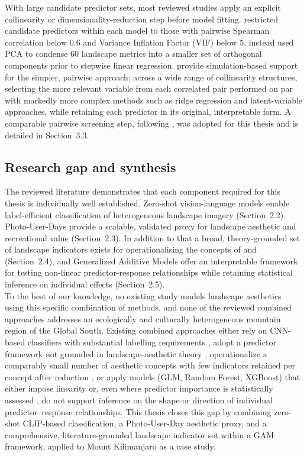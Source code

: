 \documentclass[hidelinks, 11pt]{article}
\begin{document}
With large candidate predictor sets, most reviewed studies apply an explicit collinearity or dimensionality-reduction step before model fitting. \citet{vaz_digital_2020} restricted candidate predictors within each model to those with pairwise Spearman correlation below 0.6 and Variance Inflation 
Factor (VIF) below 5. \citet{schirpke_predicting_2013} instead used PCA to condense 60 landscape metrics into a smaller set of orthogonal components prior to stepwise linear regression. \citet{dormann_collinearity_2013} provide simulation-based support for the simpler, pairwise approach: across a wide range of collinearity structures, selecting the more relevant variable from each correlated pair performed on par with markedly more complex methods such as ridge regression and latent-variable approaches, while retaining each predictor in its original, interpretable form. A comparable pairwise 
screening step, following \citet{vaz_digital_2020}, was adopted for this thesis and is detailed in Section~3.3.

\subsection{Research gap and synthesis}
The reviewed literature demonstrates that each component required for this thesis is individually well established. Zero-shot vision-language models 
enable label-efficient classification of heterogeneous landscape imagery (Section~2.2). Photo-User-Days provide a scalable, validated proxy for landscape aesthetic and recreational value (Section~2.3). In addition to that a broad, theory-grounded set of landscape indicators exists for operationalising the concepts of \citet{ode_capturing_2008} and 
\citet{tveit_key_2006} (Section~2.4), and Generalized Additive Models offer an interpretable framework for testing non-linear predictor-response relationships while retaining statistical inference on individual effects (Section~2.5).
\\
To the best of our knowledge, no existing study models landscape aesthetics using this specific combination of methods, and none of the reviewed combined approaches addresses an ecologically and culturally heterogeneous mountain region of the Global South. Existing combined approaches either rely on CNN-based classifiers with substantial labelling requirements \citep{havinga_social_2021, comalada_modelling_2025}, adopt a predictor framework not grounded in landscape-aesthetic theory \citep{vaz_digital_2020}, operationalize a comparably small number of aesthetic concepts with few indicators retained per concept after reduction \citep{tenerelli_spatial_2017}, or apply models (GLM, Random Forest, XGBoost) that either impose linearity or, even where predictor importance is statistically assessed \citep{comalada_modelling_2025}, do not support inference on the shape or direction of individual predictor–response relationships. This thesis closes this gap by combining zero-shot CLIP-based classification, a Photo-User-Day aesthetic proxy, and a comprehensive, literature-grounded landscape indicator set within a GAM framework, applied to Mount Kilimanjaro as a case study.
\end{document}
